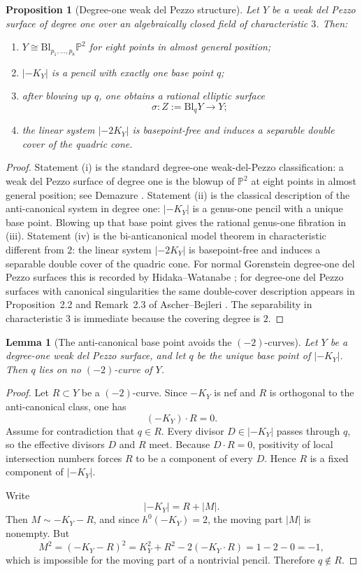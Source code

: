 \documentclass[11pt]{article}
\newtheorem{proposition}[proposition]{Proposition}
\newtheorem{lemma}[lemma]{Lemma}
\theoremstyle{definition}
\newcommand{\Pbb}{\mathbb P}
\newcommand{\Bl}{\mathrm{Bl}}
\begin{document}
\begin{proposition}[Degree-one weak del Pezzo structure]\label{prop:deg1-weak-dp}
Let $Y$ be a weak del Pezzo surface of degree one over an algebraically closed field of characteristic $3$. Then:
\begin{enumerate}[label=\textup{(\roman*)}]
\item $Y\cong \Bl_{p_1,\dots,p_8}\Pbb^2$ for eight points in almost general position;
\item $|-K_Y|$ is a pencil with exactly one base point $q$;
\item after blowing up $q$, one obtains a rational elliptic surface
\[
\sigma\colon Z:=\Bl_qY\to Y;
\]
\item the linear system $|-2K_Y|$ is basepoint-free and induces a separable double cover of the quadric cone.
\end{enumerate}
\end{proposition}

\begin{proof}
Statement (i) is the standard degree-one weak-del-Pezzo classification: a weak del Pezzo surface of degree one is the blowup of $\Pbb^2$ at eight points in almost general position; see Demazure \cite{Demazure80}. Statement (ii) is the classical description of the anti-canonical system in degree one: $|-K_Y|$ is a genus-one pencil with a unique base point. Blowing up that base point gives the rational genus-one fibration in (iii). Statement (iv) is the bi-anticanonical model theorem in characteristic different from $2$: the linear system $|-2K_Y|$ is basepoint-free and induces a separable double cover of the quadric cone. For normal Gorenstein degree-one del Pezzo surfaces this is recorded by Hidaka--Watanabe \cite{HW81}; for degree-one del Pezzo surfaces with canonical singularities the same double-cover description appears in Proposition~2.2 and Remark~2.3 of Ascher--Bejleri \cite{AscherBejleri21}. The separability in characteristic $3$ is immediate because the covering degree is $2$.
\end{proof}

\begin{lemma}[The anti-canonical base point avoids the $(-2)$-curves]\label{lem:basepoint-avoids-minus2}
Let $Y$ be a degree-one weak del Pezzo surface, and let $q$ be the unique base point of $|-K_Y|$. Then $q$ lies on no $(-2)$-curve of $Y$.
\end{lemma}

\begin{proof}
Let $R\subset Y$ be a $(-2)$-curve. Since $-K_Y$ is nef and $R$ is orthogonal to the anti-canonical class, one has
\[
(-K_Y)\cdot R=0.
\]
Assume for contradiction that $q\in R$. Every divisor $D\in |-K_Y|$ passes through $q$, so the effective divisors $D$ and $R$ meet. Because $D\cdot R=0$, positivity of local intersection numbers forces $R$ to be a component of every $D$. Hence $R$ is a fixed component of $|-K_Y|$.

Write
\[
|-K_Y| = R + |M|.
\]
Then $M\sim -K_Y-R$, and since $h^0(-K_Y)=2$, the moving part $|M|$ is nonempty. But
\[
M^2 = (-K_Y-R)^2 = K_Y^2 + R^2 - 2(-K_Y\cdot R)=1-2-0=-1,
\]
which is impossible for the moving part of a nontrivial pencil. Therefore $q\notin R$.
\end{proof}
\end{document}
